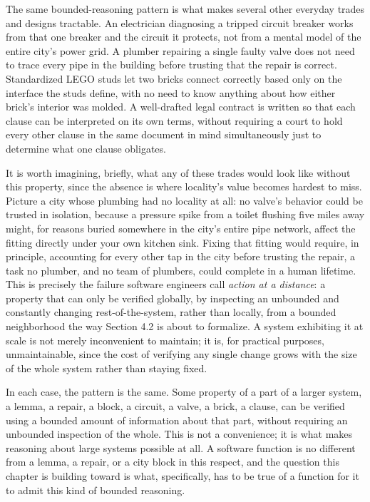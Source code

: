 \documentclass[11pt]{book}
\begin{document}
The same bounded-reasoning pattern is what makes several other everyday trades and designs tractable. An electrician diagnosing a tripped circuit breaker works from that one breaker and the circuit it protects, not from a mental model of the entire city's power grid. A plumber repairing a single faulty valve does not need to trace every pipe in the building before trusting that the repair is correct. Standardized LEGO studs let two bricks connect correctly based only on the interface the studs define, with no need to know anything about how either brick's interior was molded. A well-drafted legal contract is written so that each clause can be interpreted on its own terms, without requiring a court to hold every other clause in the same document in mind simultaneously just to determine what one clause obligates.

It is worth imagining, briefly, what any of these trades would look like without this property, since the absence is where locality's value becomes hardest to miss. Picture a city whose plumbing had no locality at all: no valve's behavior could be trusted in isolation, because a pressure spike from a toilet flushing five miles away might, for reasons buried somewhere in the city's entire pipe network, affect the fitting directly under your own kitchen sink. Fixing that fitting would require, in principle, accounting for every other tap in the city before trusting the repair, a task no plumber, and no team of plumbers, could complete in a human lifetime. This is precisely the failure software engineers call \emph{action at a distance}: a property that can only be verified globally, by inspecting an unbounded and constantly changing rest-of-the-system, rather than locally, from a bounded neighborhood the way Section 4.2 is about to formalize. A system exhibiting it at scale is not merely inconvenient to maintain; it is, for practical purposes, unmaintainable, since the cost of verifying any single change grows with the size of the whole system rather than staying fixed.

In each case, the pattern is the same. Some property of a part of a larger system, a lemma, a repair, a block, a circuit, a valve, a brick, a clause, can be verified using a bounded amount of information about that part, without requiring an unbounded inspection of the whole. This is not a convenience; it is what makes reasoning about large systems possible at all. A software function is no different from a lemma, a repair, or a city block in this respect, and the question this chapter is building toward is what, specifically, has to be true of a function for it to admit this kind of bounded reasoning.
\end{document}
